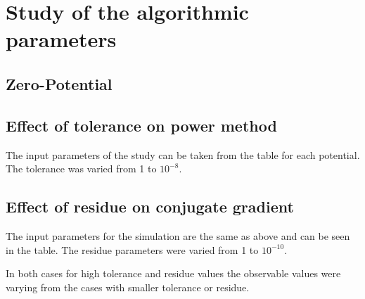\documentclass{article}
\begin{document}
\section{Study of the algorithmic parameters}\label{algrmtc parmtrs}





\subsection{Zero-Potential}


\subsection{Effect of tolerance on power method}
The input parameters of the study can be taken from the table for each potential.
The tolerance was varied from 1 to $10^{-8}$. 

\subsection{Effect of residue on conjugate gradient}
The input parameters for the simulation are the same as above and can be seen in the table.
The residue parameters were varied from 1 to $10^{-10}$.

In both cases for high tolerance and residue values the observable values were varying from the cases with smaller tolerance or residue.
\end{document}
